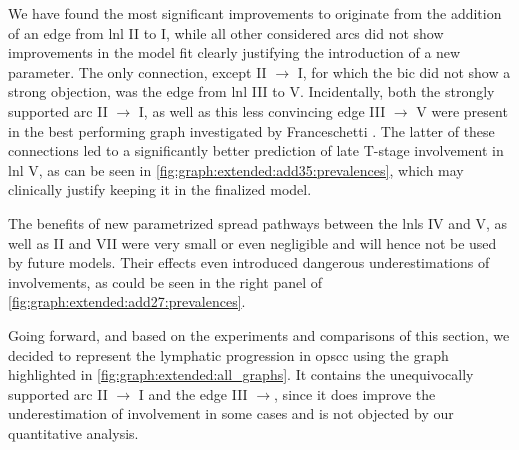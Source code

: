 \documentclass[\relativeRoot/main.tex]{subfiles}
\begin{document}
We have found the most significant improvements to originate from the addition of an edge from \gls{lnl} II to I, while all other considered arcs did not show improvements in the model fit clearly justifying the introduction of a new parameter. The only connection, except II $\rightarrow$ I, for which the \gls{bic} did not show a strong objection, was the edge from \gls{lnl} III to V. Incidentally, both the strongly supported arc II $\rightarrow$ I, as well as this less convincing edge III $\rightarrow$ V were present in the best performing graph investigated by Franceschetti \cite{franceschetti_comparison_2022}. The latter of these connections led to a significantly better prediction of late T-stage involvement in \gls{lnl} V, as can be seen in \cref{fig:graph:extended:add35:prevalences}, which may clinically justify keeping it in the finalized model.

The benefits of new parametrized spread pathways between the \glspl{lnl} IV and V, as well as II and VII were very small or even negligible and will hence not be used by future models. Their effects even introduced dangerous underestimations of involvements, as could be seen in the right panel of \cref{fig:graph:extended:add27:prevalences}.

Going forward, and based on the experiments and comparisons of this section, we decided to represent the lymphatic progression in \acrlong{opscc} using the graph highlighted in \cref{fig:graph:extended:all_graphs}. It contains the unequivocally supported arc II $\rightarrow$ I and the edge III $\rightarrow$, since it does improve the underestimation of involvement in some cases and is not objected by our quantitative analysis.
\end{document}
